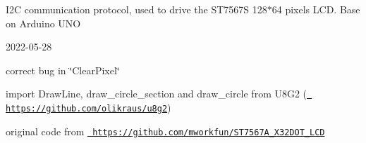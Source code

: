 I2C communication protocol, used to drive the ST7567S 128$\ast$64 pixels LCD. Base on Arduino UNO



2022-\/05-\/28
\begin{DoxyItemize}
\item correct bug in \char`\"{}\+Clear\+Pixel\char`\"{}
\item import Draw\+Line, draw\+\_\+circle\+\_\+section and draw\+\_\+circle from U8\+G2 (\href{https://github.com/olikraus/u8g2}{\texttt{ https\+://github.\+com/olikraus/u8g2}})
\end{DoxyItemize}

original code from \href{https://github.com/mworkfun/ST7567A_128X32DOT_LCD}{\texttt{ https\+://github.\+com/mworkfun/\+ST7567\+A\+\_\+X32\+DOT\+\_\+\+LCD}} 
